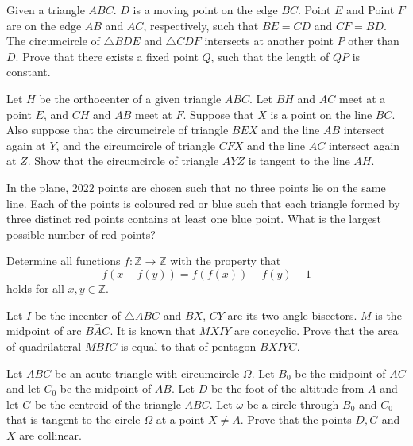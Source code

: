 \documentclass[11pt]{scrartcl}
\begin{document}
\begin{problem}[117986541208663]
Given a triangle $ABC$. $D$ is a moving point on the edge $BC$. Point $E$ and Point $F$ are on the edge $AB$ and $AC$, respectively, such that $BE=CD$ and $CF=BD$. The circumcircle of $\triangle BDE$ and $\triangle CDF$ intersects at another point $P$ other than $D$. Prove that there exists a fixed point $Q$, such that the length of $QP$ is constant.
\end{problem}
\begin{problem}[119129720704350]
Let $H$ be the orthocenter of a given triangle $ABC$. Let $BH$ and $AC$ meet at a point $E$, and $CH$ and $AB$ meet at $F$. Suppose that $X$ is a point on the line $BC$. Also suppose that the circumcircle of triangle $BEX$ and the line $AB$ intersect again at $Y$, and the circumcircle of triangle $CFX$ and the line $AC$ intersect again at $Z$.
Show that the circumcircle of triangle $AYZ$ is tangent to the line $AH$.
\end{problem}
\begin{problem}[119253293150446]
	In the plane, $2022$ points are chosen such that no three points lie on the same line. Each of the points is coloured red or blue such that each triangle formed by three distinct red points contains at least one blue point.
What is the largest possible number of red points?
\end{problem}
\begin{problem}[119687225328684]
Determine all functions $f:\mathbb{Z}\rightarrow\mathbb{Z}$ with the property that\[f(x-f(y))=f(f(x))-f(y)-1\]holds for all $x,y\in\mathbb{Z}$.
\end{problem}
\begin{problem}[120014342762916]
Let ${I}$ be the incenter of $\triangle {ABC}$ and ${BX}$, ${CY}$ are its two angle bisectors. ${M}$ is the midpoint of arc $\overset{\frown}{BAC}$. It is known that $MXIY$ are concyclic. Prove that the area of quadrilateral $MBIC$ is equal to that of pentagon $BXIYC$.
\end{problem}
\begin{problem}[120105730464462]
	Let $ABC$ be an acute triangle with circumcircle $\Omega$. Let $B_0$ be the midpoint of $AC$ and let $C_0$ be the midpoint of $AB$. Let $D$ be the foot of the altitude from $A$ and let $G$ be the centroid of the triangle $ABC$. Let $\omega$ be a circle through $B_0$ and $C_0$ that is tangent to the circle $\Omega$ at a point $X\not= A$. Prove that the points $D,G$ and $X$ are collinear.
\end{problem}
\end{document}
